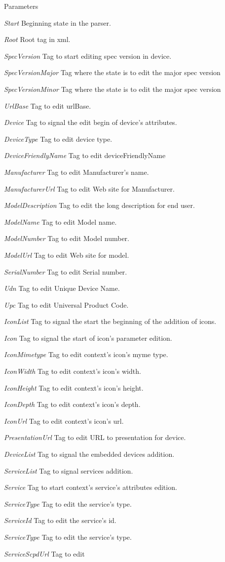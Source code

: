 \begin{DoxyParams}{Parameters}
\item[{\em Start}]Beginning state in the parser. \item[{\em Root}]Root tag in xml. \item[{\em SpecVersion}]Tag to start editing spec version in device. \item[{\em SpecVersionMajor}]Tag where the state is to edit the major spec version \item[{\em SpecVersionMinor}]Tag where the state is to edit the major spec version \item[{\em UrlBase}]Tag to edit urlBase. \item[{\em Device}]Tag to signal the edit begin of device's attributes. \item[{\em DeviceType}]Tag to edit device type. \item[{\em DeviceFriendlyName}]Tag to edit deviceFriendlyName \item[{\em Manufacturer}]Tag to edit Manufacturer's name. \item[{\em ManufacturerUrl}]Tag to edit Web site for Manufacturer. \item[{\em ModelDescription}]Tag to edit the long description for end user. \item[{\em ModelName}]Tag to edit Model name. \item[{\em ModelNumber}]Tag to edit Model number. \item[{\em ModelUrl}]Tag to edit Web site for model. \item[{\em SerialNumber}]Tag to edit Serial number. \item[{\em Udn}]Tag to edit Unique Device Name. \item[{\em Upc}]Tag to edit Universal Product Code. \item[{\em IconList}]Tag to signal the start the beginning of the addition of icons. \item[{\em Icon}]Tag to signal the start of icon's parameter edition. \item[{\em IconMimetype}]Tag to edit context's icon's myme type. \item[{\em IconWidth}]Tag to edit context's icon's width. \item[{\em IconHeight}]Tag to edit context's icon's height. \item[{\em IconDepth}]Tag to edit context's icon's depth. \item[{\em IconUrl}]Tag to edit context's icon's url. \item[{\em PresentationUrl}]Tag to edit URL to presentation for device. \item[{\em DeviceList}]Tag to signal the embedded devices addition. \item[{\em ServiceList}]Tag to signal services addition. \item[{\em Service}]Tag to start context's service's attributes edition. \item[{\em ServiceType}]Tag to edit the service's type. \item[{\em ServiceId}]Tag to edit the service's id. \item[{\em ServiceType}]Tag to edit the service's type. \item[{\em ServiceScpdUrl}]Tag to edit 
\end{DoxyParams}
